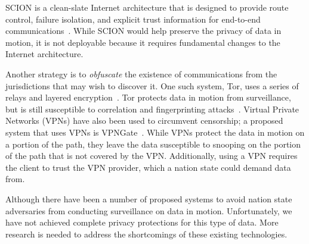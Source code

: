 SCION is a clean-slate Internet architecture that is designed to provide route
control, failure isolation, and explicit trust information for end-to-end
communications~\cite{zhang2011scion}.  While SCION would help preserve the
privacy of data in motion, it is not deployable because it requires
fundamental changes to the Internet architecture.


Another strategy is to {\em obfuscate} the existence of communications from
the jurisdictions that may wish to discover it. One such system, Tor, uses a
series of relays and layered encryption~\cite{dingledine2004tor}.  Tor
protects data in motion from surveillance, but is still susceptible to
correlation and fingerprinting
attacks~\cite{sun2015raptor,shmatikov2006timing,feamster2004loc
ation,greschbach2016effect}.  Virtual Private Networks (VPNs) have also been
used to circumvent censorship; a proposed system that uses VPNs is
VPNGate~\cite{nobori2014vpn}.  While VPNs protect the data in motion on a
portion of the path, they leave the data susceptible to snooping on the
portion of the path that is not covered by the VPN.  Additionally, using a VPN
requires the client to trust the VPN provider, which a nation state could
demand data from.

Although there have been a number of proposed systems to avoid nation state
adversaries from conducting surveillance on data in motion.  Unfortunately, we
have not achieved complete privacy protections for this type of data. More research
is needed to address the shortcomings of these existing technologies.
